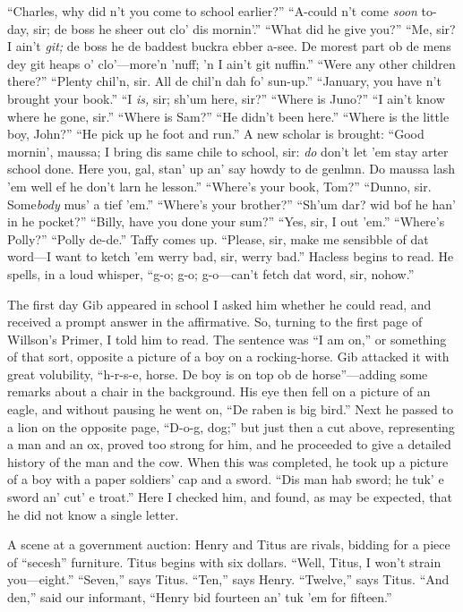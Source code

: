 \documentclass[a5paper,10pt]{book}
\begin{document}
``Charles, why did n't you come to school earlier?''  ``A-could n't
come \emph{soon} to-day, sir; de boss he sheer out clo' dis mornin'.''
``What did he give you?''  ``Me, sir? I ain't \emph{git;} de boss he
de baddest buckra ebber a-see.  De morest part ob de mens dey git
heaps o' clo'---more'n 'nuff; 'n I ain't git nuffin.''  ``Were any
other children there?''  ``Plenty chil'n, sir.  All de chil'n dah fo'
sun-up.''  ``January, you have n't brought your book.''  ``I
\emph{is,} sir; sh'um here, sir?''  ``Where is Juno?''  ``I ain't know
where he gone, sir.''  ``Where is Sam?''  ``He didn't been here.''
``Where is the little boy, John?''  ``He pick up he foot and run.''  A
new scholar is brought: ``Good mornin', maussa; I bring dis same chile
to school, sir: \emph{do} don't let 'em stay arter school done.  Here
you, gal, stan' up an' say howdy to de genlmn.  Do maussa lash 'em
well ef he don't larn he lesson.''  ``Where's your book, Tom?''
``Dunno, sir.  Some\emph{body} mus' a tief 'em.''  ``Where's your
brother?''  ``Sh'um dar?  wid bof he han' in he pocket?''  ``Billy,
have you done your sum?''  ``Yes, sir, I out 'em.''  ``Where's
Polly?''  ``Polly de-de.''  Taffy comes up.  ``Please, sir, make me
sensibble of dat word---I want to ketch 'em werry bad, sir, werry
bad.''  Hacless begins to read.  He spells, in a loud whisper, ``g-o;
g-o; g-o---can't fetch dat word, sir, nohow.''

The first day Gib appeared in school I asked him whether he could
read, and received a prompt answer in the affirmative.  So, turning to
the first page of Willson's Primer, I told him to read.  The sentence
was ``I am on,'' or something of that sort, opposite a picture of a
boy on a rocking-horse.  Gib attacked it with great volubility,
``h-r-s-e, horse.  De boy is on top ob de horse''---adding some
remarks about a chair in the background.  His eye then fell on a
picture of an eagle, and without pausing he went on, ``De raben is big
bird.''  Next he passed to a lion on the opposite page, ``D-o-g,
dog;'' but just then a cut above, representing a man and an ox, proved
too strong for him, and he proceeded to give a detailed history of the
man and the cow.  When this was completed, he took up a picture of a
boy with a paper soldiers' cap and a sword.  ``Dis man hab sword; he
tuk' e sword an' cut' e troat.''  Here I checked him, and found, as
may be expected, that he did not know a single letter.

A scene at a government auction: Henry and Titus are rivals, bidding
for a piece of ``secesh'' furniture.  Titus begins with six dollars.
``Well, Titus, I won't strain you---eight.''  ``Seven,'' says Titus.
``Ten,'' says Henry.  ``Twelve,'' says Titus.  ``And den,'' said our
informant, ``Henry bid fourteen an' tuk 'em for fifteen.''
\end{document}
